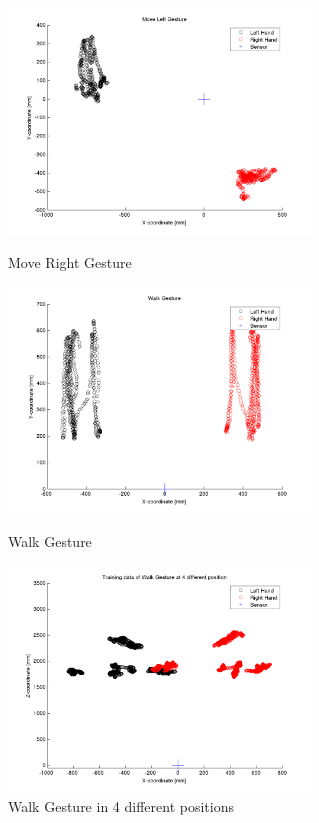 \begin{figure}
\begin{minipage}
		{.45 
		\textwidth}  
		\includegraphics[height=60mm]{figures/result/plot-ges-5.png} \caption{Move Right Gesture} \label{pl:ges:5} 
	\end{minipage}
	\begin{minipage}
		{.45 
		\textwidth}  
		\includegraphics[height=60mm]{figures/result/plot-ges-1.png} \caption{Walk Gesture} \label{pl:ges:1} 
	\end{minipage}
	\hfill	
	\begin{minipage}
		{.45 
		\textwidth}		  	
		\includegraphics[height=60mm]{figures/result/plot-ges-pos-4.png} 		
		\caption{Walk Gesture in 4 different positions} \label{pl:ges:pos} 
	\end{minipage}
\end{figure}
\label{fg:ges:hands} \label{fg:ges:plot}

